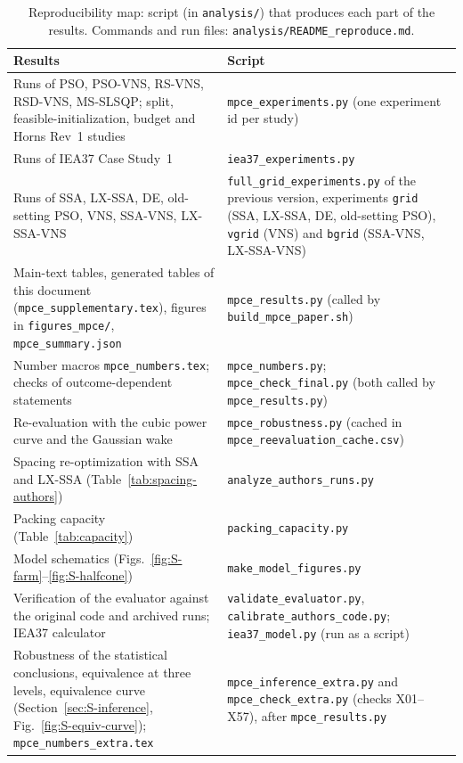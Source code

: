 \documentclass[10pt]{article}
\begin{document}
\begin{table}[!htb]
\centering
\caption{Reproducibility map: script (in \texttt{analysis/}) that produces each part of the results. Commands and run files: \texttt{analysis/README\_reproduce.md}.}
\label{tab:S-repro}
\footnotesize\setlength{\tabcolsep}{4pt}
\begin{tabular}{>{\raggedright\arraybackslash}p{}>{\raggedright\arraybackslash}p{}}
\toprule
Results & Script \\
\midrule
Runs of PSO, PSO-VNS, RS-VNS, RSD-VNS, MS-SLSQP; split, feasible-initialization, budget and Horns Rev~1 studies & \texttt{mpce\_experiments.py} (one experiment id per study) \\
Runs of IEA37 Case Study~1 & \texttt{iea37\_experiments.py} \\
Runs of SSA, LX-SSA, DE, old-setting PSO, VNS, SSA-VNS, LX-SSA-VNS & \texttt{full\_grid\_experiments.py} of the previous version, experiments \texttt{grid} (SSA, LX-SSA, DE, old-setting PSO), \texttt{vgrid} (VNS) and \texttt{bgrid} (SSA-VNS, LX-SSA-VNS) \\
Main-text tables, generated tables of this document (\texttt{mpce\_supplementary.tex}), figures in \texttt{figures\_mpce/}, \texttt{mpce\_summary.json} & \texttt{mpce\_results.py} (called by \texttt{build\_mpce\_paper.sh}) \\
Number macros \texttt{mpce\_numbers.tex}; checks of outcome-dependent statements & \texttt{mpce\_numbers.py}; \texttt{mpce\_check\_final.py} (both called by \texttt{mpce\_results.py}) \\
Re-evaluation with the cubic power curve and the Gaussian wake & \texttt{mpce\_robustness.py} (cached in \texttt{mpce\_reevaluation\_cache.csv}) \\
Spacing re-optimization with SSA and LX-SSA (Table~\ref{tab:spacing-authors}) & \texttt{analyze\_authors\_runs.py} \\
Packing capacity (Table~\ref{tab:capacity}) & \texttt{packing\_capacity.py} \\
Model schematics (Figs.~\ref{fig:S-farm}--\ref{fig:S-halfcone}) & \texttt{make\_model\_figures.py} \\
Verification of the evaluator against the original code and archived runs; IEA37 calculator & \texttt{validate\_evaluator.py}, \texttt{calibrate\_authors\_code.py}; \texttt{iea37\_model.py} (run as a script) \\
Robustness of the statistical conclusions, equivalence at three levels, equivalence curve (Section~\ref{sec:S-inference}, Fig.~\ref{fig:S-equiv-curve}); \texttt{mpce\_numbers\_extra.tex} & \texttt{mpce\_inference\_extra.py} and \texttt{mpce\_check\_extra.py} (checks X01--X57), after \texttt{mpce\_results.py} \\

\end{tabular}
\end{table}
\end{document}
